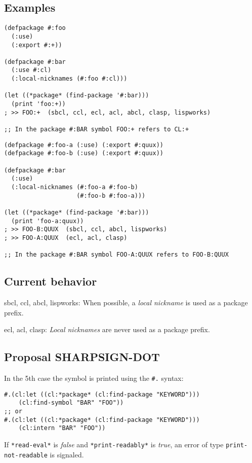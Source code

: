 \documentclass[11pt]{article}
\begin{document}
\subsection{Examples}
\label{sec:org7176e4f}
\begin{verbatim}
(defpackage #:foo
  (:use)
  (:export #:+))

(defpackage #:bar
  (:use #:cl)
  (:local-nicknames (#:foo #:cl)))

(let ((*package* (find-package '#:bar)))
  (print 'foo:+))
; >> FOO:+  (sbcl, ccl, ecl, acl, abcl, clasp, lispworks)

;; In the package #:BAR symbol FOO:+ refers to CL:+
\end{verbatim}

\begin{verbatim}
(defpackage #:foo-a (:use) (:export #:quux))
(defpackage #:foo-b (:use) (:export #:quux))

(defpackage #:bar
  (:use)
  (:local-nicknames (#:foo-a #:foo-b)
                    (#:foo-b #:foo-a)))

(let ((*package* (find-package '#:bar)))
  (print 'foo-a:quux))
; >> FOO-B:QUUX  (sbcl, ccl, abcl, lispworks)
; >> FOO-A:QUUX  (ecl, acl, clasp)

;; In the package #:BAR symbol FOO-A:QUUX refers to FOO-B:QUUX
\end{verbatim}
\subsection{Current behavior}
\label{sec:org02fef91}
sbcl, ccl, abcl, lispworks:
  When possible, a \emph{local nickname} is used as a package prefix.

ecl, acl, clasp:
  \emph{Local nicknames} are never used as a package prefix.
\subsection{Proposal SHARPSIGN-DOT}
\label{sec:orga0327df}
In the 5th case the symbol is printed using the \texttt{\#.} syntax:

\begin{verbatim}
#.(cl:let ((cl:*package* (cl:find-package "KEYWORD")))
    (cl:find-symbol "BAR" "FOO"))
;; or
#.(cl:let ((cl:*package* (cl:find-package "KEYWORD")))
    (cl:intern "BAR" "FOO"))
\end{verbatim}

If \texttt{*read-eval*} is \emph{false} and \texttt{*print-readably*} is \emph{true}, an error of type
\texttt{print-not-readable} is signaled.
\end{document}

